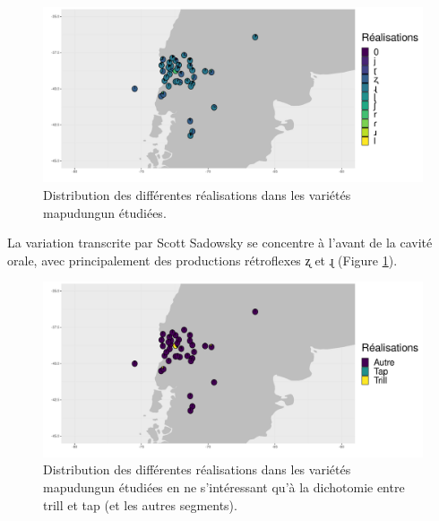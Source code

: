 \begin{figure}
	\centering
	\includegraphics[width=1\linewidth]{substance/images/productionmapudungun_1_viridis}
	\caption[Distribution des différentes réalisations dans les variétés mapudungun]{Distribution des différentes réalisations dans les variétés mapudungun étudiées.}
	\label{fig:productionmapudungun1viridis}
\end{figure}

La variation transcrite par Scott Sadowsky se concentre à l'avant de la cavité orale, avec principalement des productions rétroflexes ʐ et ɻ (Figure \ref{fig:productionmapudungun1viridis}).\\

\begin{figure}
	\centering
	\includegraphics[width=1\linewidth]{substance/images/productionmapudungun_3_viridis}
	\caption[Distribution des différentes réalisations dans les variétés mapudungun pour le trill et tap]{Distribution des différentes réalisations dans les variétés mapudungun étudiées en ne s'intéressant qu'à la dichotomie entre trill et tap (et les autres segments).}
	\label{fig:productionmapudungun3viridis}
\end{figure}

